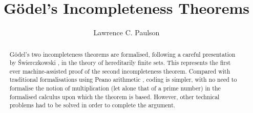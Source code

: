 \documentclass[11pt,a4paper]{report}
\begin{document}
\title{G\"odel's Incompleteness Theorems}
\author{Lawrence C. Paulson}
\maketitle

\begin{abstract}
G\"odel's two incompleteness theorems \cite{goedel-I} are formalised, following a careful presentation by {\'S}wierczkowski \cite{swierczkowski-finite}, in the theory of hereditarily finite sets. This represents the first ever machine-assisted proof of the second incompleteness theorem. Compared with traditional formalisations using Peano arithmetic \cite{boolos-provability}, coding is simpler, with no need to formalise the notion of multiplication (let alone that of a prime number) in the formalised calculus upon which the theorem is based. 
However, other technical problems had to be solved in order to complete the argument.
\end{abstract}

\tableofcontents





\end{document}
